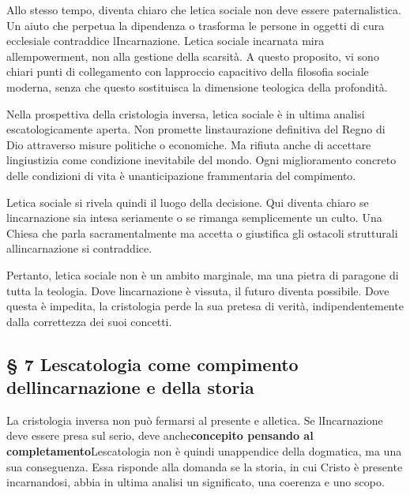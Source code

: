 \documentclass[
]{article}
\begin{document}
Allo stesso tempo, diventa chiaro che l\textquotesingle etica sociale non deve essere paternalistica. Un aiuto che perpetua la dipendenza o trasforma le persone in oggetti di cura ecclesiale contraddice l\textquotesingle Incarnazione. L\textquotesingle etica sociale incarnata mira all\textquotesingle empowerment, non alla gestione della scarsità. A questo proposito, vi sono chiari punti di collegamento con l\textquotesingle approccio capacitivo della filosofia sociale moderna, senza che questo sostituisca la dimensione teologica della profondità.

Nella prospettiva della cristologia inversa, l\textquotesingle etica sociale è in ultima analisi escatologicamente aperta. Non promette l\textquotesingle instaurazione definitiva del Regno di Dio attraverso misure politiche o economiche. Ma rifiuta anche di accettare l\textquotesingle ingiustizia come condizione inevitabile del mondo. Ogni miglioramento concreto delle condizioni di vita è un\textquotesingle anticipazione frammentaria del compimento.

L\textquotesingle etica sociale si rivela quindi il luogo della decisione. Qui diventa chiaro se l\textquotesingle incarnazione sia intesa seriamente o se rimanga semplicemente un culto. Una Chiesa che parla sacramentalmente ma accetta o giustifica gli ostacoli strutturali all\textquotesingle incarnazione si contraddice.

Pertanto, l\textquotesingle etica sociale non è un ambito marginale, ma una pietra di paragone di tutta la teologia. Dove l\textquotesingle incarnazione è vissuta, il futuro diventa possibile. Dove questa è impedita, la cristologia perde la sua pretesa di verità, indipendentemente dalla correttezza dei suoi concetti.

\subsection{\texorpdfstring{\textbf{§ 7 L\textquotesingle escatologia come compimento dell\textquotesingle incarnazione e della storia}}{§ 7 L\textquotesingle escatologia come compimento dell\textquotesingle incarnazione e della storia}}\label{lescatologia-come-compimento-dellincarnazione-e-della-storia}

La cristologia inversa non può fermarsi al presente e all\textquotesingle etica. Se l\textquotesingle Incarnazione deve essere presa sul serio, deve anche\textbf{concepito pensando al completamento}L\textquotesingle escatologia non è quindi un\textquotesingle appendice della dogmatica, ma una sua conseguenza. Essa risponde alla domanda se la storia, in cui Cristo è presente incarnandosi, abbia in ultima analisi un significato, una coerenza e uno scopo.
\end{document}

